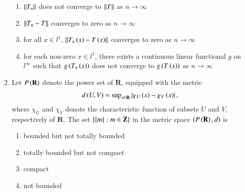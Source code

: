 \documentclass[journal]{IEEEtran}
\numberwithin{equation}{enumi}
\numberwithin{figure}{enumi}
\begin{document}
\begin{enumerate}
		\hfill{}
		
		\begin{enumerate}
			\item $\left\lVert T_n\right\rVert$ does not converge to $\left\lVert T\right\rVert$ as $n\to \infty$
			\item $\left\lVert T_n - T\right\rVert$ converges to zero as $n\to \infty$
			\item for all $x \in l^1$, $\left\lVert T_n\left(x\right) - T\left(x\right)\right\rVert$ converges to zero as $n\to \infty$
			\item for each non-zero $x \in l^1$, there exists a continuous linear functional $g$ on $l^{\infty}$ such that $g\left(T_n\left(x\right)\right)$ does not converge to $g\left(T\left(x\right)\right)$ as $n\to \infty$
		\end{enumerate}

		\item 
		Let $P\left(\mathbf{R}\right)$ denote the power set of $\mathbf{R}$, equipped with the metric 
		\begin{align*}
			d\left(U,V\right) = \text{sup}_{x \in \mathbf{R}}\left\vert\chi_U\left(x\right) - \chi_V\left(x\right)\right\vert,
		\end{align*}
		where $\chi_U$ and $\chi_V$ denote the characteristic function of subsets $U$ and $V$, respectively of $\mathbf{R}$. The set $\left\{\left\{m\right\}:m \in \mathbf{Z}\right\}$ in the metric space $\left(P\left(\mathbf{R}\right), d\right)$ is 
		
		\hfill{}
		
		\begin{multicols}{2}
			\begin{enumerate}
				\item bounded but not totally bounded 
				\item totally bounded but not compact
				\item compact 
				\item not bounded
			\end{enumerate}
		\end{multicols}
	\end{enumerate}
\end{document}
